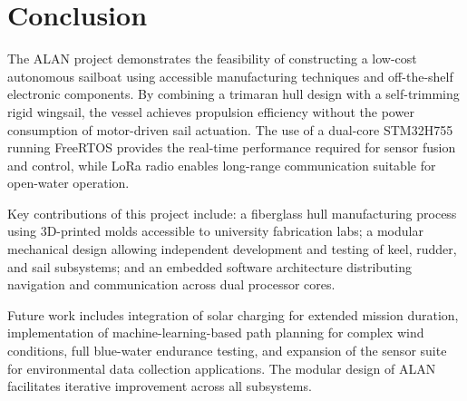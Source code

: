 
\section{Conclusion}
\label{sec:conclusion}

The ALAN project demonstrates the feasibility of constructing a low-cost autonomous sailboat using accessible manufacturing techniques and off-the-shelf electronic components. By combining a trimaran hull design with a self-trimming rigid wingsail, the vessel achieves propulsion efficiency without the power consumption of motor-driven sail actuation. The use of a dual-core STM32H755 running FreeRTOS provides the real-time performance required for sensor fusion and control, while LoRa radio enables long-range communication suitable for open-water operation.

Key contributions of this project include: a fiberglass hull manufacturing process using 3D-printed molds accessible to university fabrication labs; a modular mechanical design allowing independent development and testing of keel, rudder, and sail subsystems; and an embedded software architecture distributing navigation and communication across dual processor cores.

Future work includes integration of solar charging for extended mission duration, implementation of machine-learning-based path planning for complex wind conditions, full blue-water endurance testing, and expansion of the sensor suite for environmental data collection applications. The modular design of ALAN facilitates iterative improvement across all subsystems.

